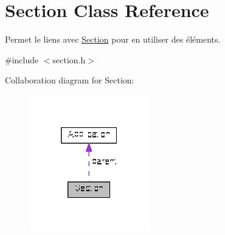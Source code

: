 \hypertarget{class_section}{\section{Section Class Reference}
\label{class_section}
}


Permet le liens avec \hyperlink{class_section}{Section} pour en utiliser des éléments.  




{\ttfamily \#include $<$section.\+h$>$}



Collaboration diagram for Section\+:
\nopagebreak
\begin{figure}[H]
\begin{center}
\leavevmode
\includegraphics[width=148pt]{class_section__coll__graph}
\end{center}
\end{figure}
